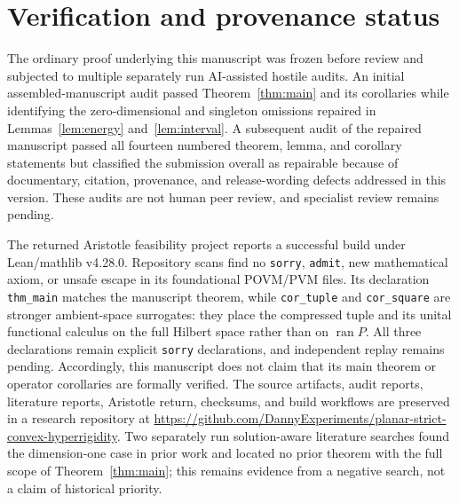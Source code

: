 \documentclass[11pt,a4paper]{amsart}
\theoremstyle{remark}
\newcommand{\ran}{\operatorname{ran}}
\begin{document}
\section*{Verification and provenance status}

The ordinary proof underlying this manuscript was frozen before review and
subjected to multiple separately run AI-assisted hostile audits.  An initial
assembled-manuscript audit passed Theorem~\ref{thm:main} and its corollaries
while identifying the zero-dimensional and singleton omissions repaired in
Lemmas~\ref{lem:energy} and~\ref{lem:interval}.  A subsequent audit of the
repaired manuscript passed all fourteen numbered theorem, lemma, and
corollary statements but classified the submission overall as repairable
because of documentary, citation, provenance, and release-wording defects
addressed in this version.  These audits are not human peer review, and
specialist review remains pending.

The returned Aristotle feasibility project reports a successful build under
Lean/mathlib v4.28.0.  Repository scans find no \texttt{sorry},
\texttt{admit}, new mathematical axiom, or unsafe escape in its foundational
POVM/PVM files.  Its declaration \texttt{thm\_main} matches the manuscript
theorem, while \texttt{cor\_tuple} and \texttt{cor\_square} are stronger
ambient-space surrogates: they place the compressed tuple and its unital
functional calculus on the full Hilbert space rather than on
\(\ran P\).  All three declarations remain explicit \texttt{sorry}
declarations, and independent replay remains pending.
Accordingly, this manuscript does not claim that its main theorem or operator
corollaries are formally verified.  The source artifacts, audit reports,
literature reports, Aristotle return, checksums, and build workflows are
preserved in a
research repository at
\url{https://github.com/DannyExperiments/planar-strict-convex-hyperrigidity}.
Two separately run solution-aware literature searches found the
dimension-one case in prior work and located no prior theorem with the full
scope of Theorem~\ref{thm:main}; this remains evidence from a negative
search, not a claim of historical priority.
\end{document}
